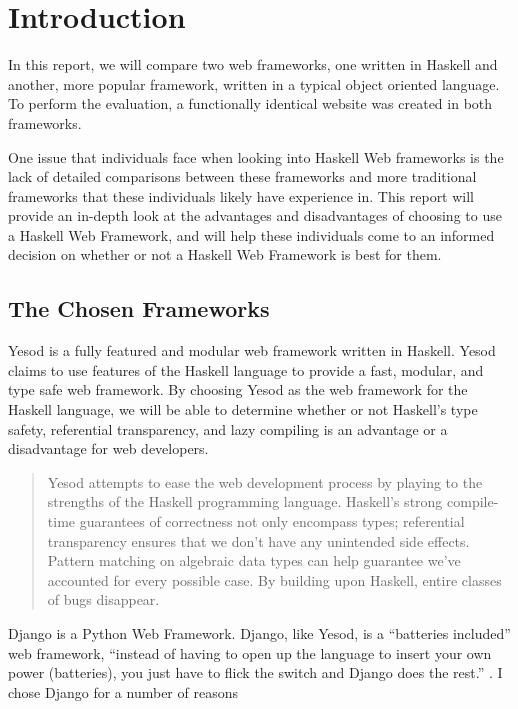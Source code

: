\chapter{Introduction}

In this report, we will compare two web frameworks, one written in Haskell and another, more
popular framework, written in a typical object oriented language. To perform the evaluation,
a functionally identical website was created in both frameworks.

One issue that individuals face when looking into Haskell Web frameworks is the lack of
detailed comparisons between these frameworks and more traditional frameworks that these
individuals likely have experience in. This report will provide an in-depth look at the
advantages and disadvantages of choosing to use a Haskell Web Framework, and will help
these individuals come to an informed decision on whether or not a Haskell Web Framework is
best for them.

\section{The Chosen Frameworks}

Yesod is a fully featured and modular web framework written in Haskell. Yesod claims to use
features of the Haskell language to provide a fast, modular, and type safe web framework. By
choosing Yesod as the web framework for the Haskell language, we will be able to determine
whether or not Haskell's type safety, referential transparency, and lazy compiling is an advantage
or a disadvantage for web developers.

\begin{quote}
Yesod attempts to ease the web development process by playing to the strengths of the Haskell 
programming language. Haskell’s strong compile-time guarantees of correctness not only encompass 
types; referential transparency ensures that we don’t have any unintended side effects. Pattern 
matching on algebraic data types can help guarantee we’ve accounted for every possible case. 
By building upon Haskell, entire classes of bugs disappear. \parencite[Introduction]{yesodBook}
\end{quote}

Django is a Python Web Framework. Django, like Yesod, is a ``batteries included'' web framework,
``instead of having to open up the language to insert your own power (batteries), you just have
to flick the switch and Django does the rest.'' \parencite{djangoBookReasons}. I chose Django
for a number of reasons

